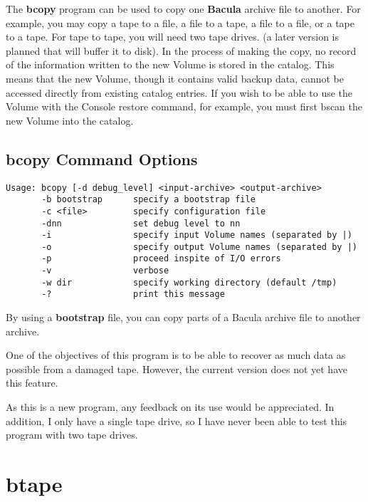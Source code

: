 The {\bf bcopy} program can be used to copy one {\bf Bacula} archive file to
another. For example, you may copy a tape to a file, a file to a tape, a file
to a file, or a tape to a tape. For tape to tape, you will need two tape
drives. (a later version is planned that will buffer it to disk). In the
process of making the copy, no record of the information written to the new
Volume is stored in the catalog. This means that the new Volume, though it
contains valid backup data, cannot be accessed directly from existing catalog
entries. If you wish to be able to use the Volume with the Console restore
command, for example, you must first bscan the new Volume into the catalog. 

\subsection{bcopy Command Options}

\footnotesize
\begin{verbatim}
Usage: bcopy [-d debug_level] <input-archive> <output-archive>
       -b bootstrap      specify a bootstrap file
       -c <file>         specify configuration file
       -dnn              set debug level to nn
       -i                specify input Volume names (separated by |)
       -o                specify output Volume names (separated by |)
       -p                proceed inspite of I/O errors
       -v                verbose
       -w dir            specify working directory (default /tmp)
       -?                print this message
\end{verbatim}
\normalsize

By using a {\bf bootstrap} file, you can copy parts of a Bacula archive file
to another archive. 

One of the objectives of this program is to be able to recover as much data as
possible from a damaged tape. However, the current version does not yet have
this feature. 

As this is a new program, any feedback on its use would be appreciated. In
addition, I only have a single tape drive, so I have never been able to test
this program with two tape drives. 

\section{btape}
\label{btape}

